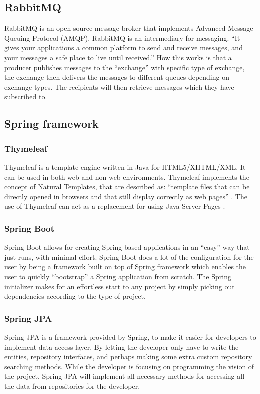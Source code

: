 \subsection{RabbitMQ}
\label{sub:rabbitmq}

RabbitMQ is an open source message broker that implements Advanced Message Queuing Protocol (AMQP). RabbitMQ is an intermediary for messaging. “It gives your applications a common platform to send and receive messages, and your messages a safe place to live until received.” \cite{rabbitftrs}
How this works is that a producer publishes messages to the “exchange” with specific type of exchange, the exchange then delivers the messages to different queues depending on exchange types. The recipients will then retrieve messages which they have subscribed to.

\subsection{Spring framework}
\label{sub:spring}
\subsubsection{Thymeleaf}
Thymeleaf is a template engine written in Java for HTML5/XHTML/XML. It can be used in both web and non-web environments. Thymeleaf implements the concept of Natural Templates, that are described as: “template files that can be directly opened in browsers and that still display correctly as web pages” \cite{thymlf}. The use of Thymeleaf can act as a replacement for using Java Server Pages \cite{javaserverpages}.
\subsubsection{Spring Boot}
Spring Boot allows for creating Spring based applications in an “easy” way that just runs, with minimal effort. Spring Boot does a lot of the configuration for the user by being a framework built on top of Spring framework which enables the user to quickly “bootstrap” a Spring application from scratch. The Spring initializer makes for an effortless start to any project by simply picking out dependencies according to the type of project.
\subsubsection{Spring JPA}
Spring JPA is a framework provided by Spring, to make it easier for developers to implement data access layer. By letting the developer only have to write the entities, repository interfaces, and perhaps making some extra custom repository searching methods. While the developer is focusing on programming the vision of the project, Spring JPA will implement all necessary methods for accessing all the data from repositories for the developer.
